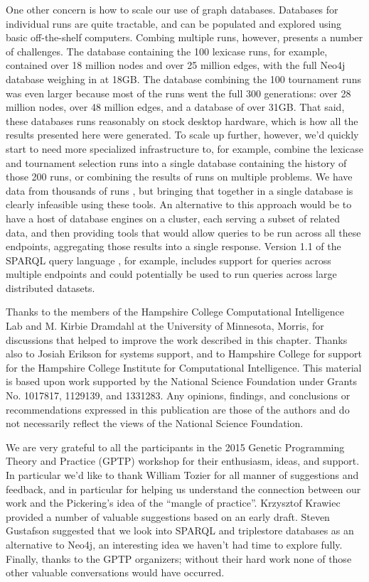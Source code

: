 One other concern is how to scale our use of graph databases. Databases for individual runs are quite tractable,
and can be populated and explored using basic off-the-shelf computers. Combing multiple runs, however, presents a
number of challenges. The database containing the 100 lexicase runs, for example, contained over 18 million nodes 
and over 25 million edges, with the full Neo4j database weighing in at 18GB. The database combining the 100 tournament
runs was even larger because most of the runs went the full 300 generations: over 28 million nodes, over 48 million edges,
and a database of over 31GB. That said, these databases runs reasonably on stock desktop 
hardware, which is how all the results presented here were generated. To scale up further, however, 
we'd quickly start to need more specialized infrastructure to, for example, combine the 
lexicase and tournament selection runs into a single database containing the history of those 200 runs, or combining
the results of runs on multiple problems. We have data from thousands of runs \citep{Helmuth:2015:GPTP}, but bringing
that together in a single database is clearly infeasible using these tools. An alternative to this approach would be
to have a host of database engines on a cluster, each serving a subset of related data, and then providing tools
that would allow queries to be run across all these endpoints, aggregating those results into a single response. Version
1.1 of the SPARQL query language \citep{wiki:SPARQL}, for example, includes support for queries across multiple endpoints
and could potentially be used to run queries across large distributed datasets.

\begin{acknowledgement}
	Thanks to the members of the Hampshire College Computational Intelligence Lab and M. Kirbie Dramdahl
	at the University of Minnesota, Morris, for discussions that 
	helped to improve the work described in this chapter. Thanks also to Josiah Erikson for systems support, and to 
	Hampshire College for support for the Hampshire College Institute for Computational Intelligence. 
	This material is based upon work supported by the National Science Foundation under Grants No. 1017817, 
	1129139, and 1331283. Any opinions, findings, and conclusions or recommendations expressed in this 
	publication are those of the authors and do not necessarily reflect the views of the National 
	Science Foundation.	
	
	We are very grateful to all the participants in the 2015 Genetic Programming Theory and Practice (GPTP)
	workshop for their enthusiasm, ideas, and support. In particular we'd like to thank William Tozier 
	for all manner of suggestions and feedback, and in particular for helping us understand
	the connection between our work and the Pickering's idea of the ``mangle of practice''. Krzysztof Krawiec
	provided a number of valuable suggestions based on an early draft. Steven Gustafson suggested that we
	look into SPARQL and triplestore databases as an alternative to Neo4j, an interesting idea we haven't had time to
	explore fully. Finally, thanks to the GPTP organizers; without their hard work none of those other valuable
	conversations would have occurred.
\end{acknowledgement}



